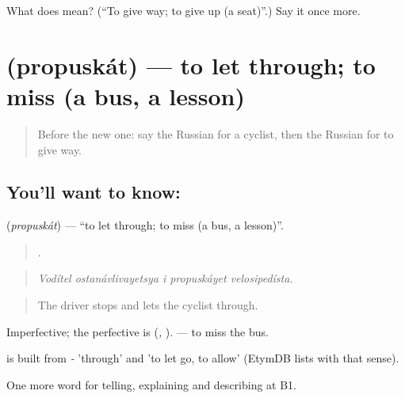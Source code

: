 \begin{tcolorbox}[breakable,colback=teal!4,colframe=teal!35!black,title={Before you move on}]
What does  mean? (\textquotedblleft{}To give way; to give up (a seat)\textquotedblright{}.) Say it once more.
\end{tcolorbox}
\section[\texorpdfstring{\ru{пропускать} (propuskát)}{пропускать (propuskát)}]{ (propuskát) — to let through; to miss (a bus, a lesson)}

\label{lesson:RU-C412-propuskat}



\begin{quote}
Before the new one: say the Russian for a cyclist, then the Russian for to give way.
\end{quote}

\subsection*{You'll want to know: }
\textbf{} (\emph{propuskát}) — \textquotedblleft{}to let through; to miss (a bus, a lesson)\textquotedblright{}.

\begin{quote}
    .
\end{quote}

\begin{quote}
\emph{Vodítel ostanávlivayetsya i propuskáyet velosipedísta.}
\end{quote}

\begin{quote}
The driver stops and lets the cyclist through.
\end{quote}

Imperfective; the perfective is \emph{} (\emph{, }). \emph{ } — to miss the bus.

\begin{cousinweb}
\emph{} is built from \emph{-} 'through' and \emph{} 'to let go, to allow' (EtymDB lists \emph{} with that sense).
\end{cousinweb}

\begin{grammarlens}[title={What you've built}]
One more word for telling, explaining and describing at B1.
\end{grammarlens}

